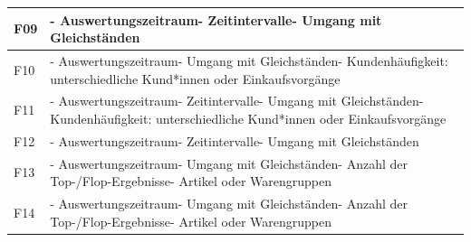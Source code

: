 \documentclass[a4paper,10pt]{article}
\begin{document}
\begin{longtable}{>{\raggedright\arraybackslash}p{}>{\raggedright\arraybackslash}p{}}
            \midrule
            F09                 & - Auswertungszeitraum\newline - Zeitintervalle\newline - Umgang mit Gleichständen                                                                                          \\
            \midrule
            F10                 & - Auswertungszeitraum\newline - Umgang mit Gleichständen\newline - Kundenhäufigkeit: unterschiedliche Kund*innen oder Einkaufsvorgänge \\
            \midrule
            F11                 & - Auswertungszeitraum\newline - Zeitintervalle\newline - Umgang mit Gleichständen\newline - Kundenhäufigkeit: unterschiedliche Kund*innen oder Einkaufsvorgänge            \\
            \midrule
            F12                 & - Auswertungszeitraum\newline - Zeitintervalle\newline - Umgang mit Gleichständen                                                      \\
            \midrule
            F13                 & - Auswertungszeitraum\newline - Umgang mit Gleichständen\newline - Anzahl der Top-/Flop-Ergebnisse\newline - Artikel oder Warengruppen                                     \\
            \midrule
            F14                 & - Auswertungszeitraum\newline - Umgang mit Gleichständen\newline - Anzahl der Top-/Flop-Ergebnisse\newline - Artikel oder Warengruppen                                     \\
        \end{longtable}
\addtocounter{table}{-1}
        \clearpage
\end{document}
